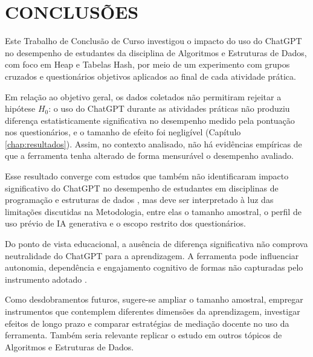 
\chapter{CONCLUSÕES}
\label{chap:conclusoes}

Este Trabalho de Conclusão de Curso investigou o impacto do uso do ChatGPT no desempenho de estudantes da disciplina de Algoritmos e Estruturas de Dados, com foco em Heap e Tabelas Hash, por meio de um experimento com grupos cruzados e questionários objetivos aplicados ao final de cada atividade prática.

Em relação ao objetivo geral, os dados coletados não permitiram rejeitar a hipótese $H_{0}$: o uso do ChatGPT durante as atividades práticas não produziu diferença estatisticamente significativa no desempenho medido pela pontuação nos questionários, e o tamanho de efeito foi negligível (Capítulo \ref{chap:resultados}). Assim, no contexto analisado, não há evidências empíricas de que a ferramenta tenha alterado de forma mensurável o desempenho avaliado.

Esse resultado converge com estudos que também não identificaram impacto significativo do ChatGPT no desempenho de estudantes em disciplinas de programação e estruturas de dados \cite{kosar2024chatgpt}, mas deve ser interpretado à luz das limitações discutidas na Metodologia, entre elas o tamanho amostral, o perfil de uso prévio de IA generativa e o escopo restrito dos questionários.

Do ponto de vista educacional, a ausência de diferença significativa não comprova neutralidade do ChatGPT para a aprendizagem. A ferramenta pode influenciar autonomia, dependência e engajamento cognitivo de formas não capturadas pelo instrumento adotado \cite{kosmyna2025brain,delikoura2025superficial}.

Como desdobramentos futuros, sugere-se ampliar o tamanho amostral, empregar instrumentos que contemplem diferentes dimensões da aprendizagem, investigar efeitos de longo prazo e comparar estratégias de mediação docente no uso da ferramenta. Também seria relevante replicar o estudo em outros tópicos de Algoritmos e Estruturas de Dados.
